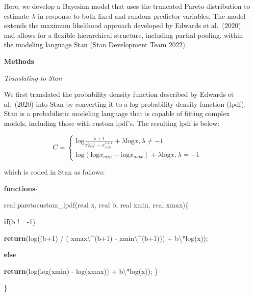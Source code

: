\documentclass[
  12pt,
]{article}
\newenvironment{Shaded}{\begin{snugshade}}{\end{snugshade}}
\newcommand{\ControlFlowTok}[1]{\textcolor[rgb]{0.13,0.29,0.53}{\textbf{#1}}}
\newcommand{\DataTypeTok}[1]{\textcolor[rgb]{0.13,0.29,0.53}{#1}}
\newcommand{\DecValTok}[1]{\textcolor[rgb]{0.00,0.00,0.81}{#1}}
\newcommand{\KeywordTok}[1]{\textcolor[rgb]{0.13,0.29,0.53}{\textbf{#1}}}
\newcommand{\NormalTok}[1]{#1}
\begin{document}
Here, we develop a Bayesian model that uses the truncated Pareto
distribution to estimate \(\lambda\) in response to both fixed and
random predictor variables. The model extends the maximum likelihood
approach developed by Edwards et al.~(2020) and allows for a flexible
hierarchical structure, including partial pooling, within the modeling
language Stan (Stan Development Team 2022).

\textbf{Methods}

\emph{Translating to Stan}

We first translated the probability density function described by
Edwards et al.~(2020) into Stan by converting it to a log probability
density function (lpdf). Stan is a probabilistic modeling language that
is capable of fitting complex models, including those with custom
lpdf's. The resulting lpdf is below:

\[
 C = \begin{cases}\text{log}\frac{\lambda + 1}{{x_{max}^{\lambda+1}} - {x_{min}^{\lambda+1}}} + \lambda\text{log}x, \lambda \neq-1 \\
\text{log}({{\text{log}x_{min}} - {\text{log}x_{max}}}) + \lambda\text{log}x, \lambda = -1\end{cases}
\]

which is coded in Stan as follows:

\begin{Shaded}
\begin{Highlighting}[]

\KeywordTok{functions}\NormalTok{\{}

\DataTypeTok{real}\NormalTok{ paretocustom\_lpdf(}\DataTypeTok{real}\NormalTok{ x, }\DataTypeTok{real}\NormalTok{ b, }\DataTypeTok{real}\NormalTok{ xmin, }\DataTypeTok{real}\NormalTok{ xmax)\{}

\ControlFlowTok{if}\NormalTok{(b != {-}}\DecValTok{1}\NormalTok{)}

\ControlFlowTok{return}\NormalTok{(log((b+}\DecValTok{1}\NormalTok{) / ( xmax\textbackslash{}\^{}(b+}\DecValTok{1}\NormalTok{) {-} xmin\textbackslash{}\^{}(b+}\DecValTok{1}\NormalTok{))) + b\textbackslash{}*log(x));}

\ControlFlowTok{else}

\ControlFlowTok{return}\NormalTok{(log(log(xmin) {-} log(xmax)) + b\textbackslash{}*log(x));}
\NormalTok{  \}}

\NormalTok{\}}
\end{Highlighting}
\end{Shaded}
\end{document}
